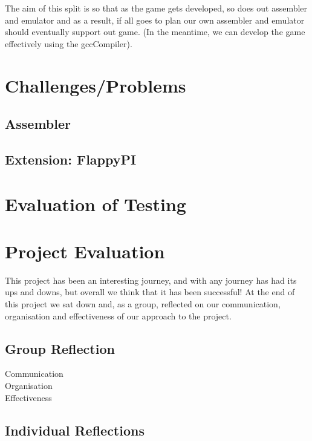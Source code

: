 \documentclass[11pt]{article}
\begin{document}
The aim of this split is so that as the game gets developed, so does out assembler and emulator and as a result, if all goes to plan our own assembler and emulator should eventually support out game. (In the meantime, we can develop the game effectively using the gccCompiler).


\section{Challenges/Problems}

\subsection{Assembler}

\subsection{Extension: FlappyPI}


\section{Evaluation of Testing}




\section{Project Evaluation}
This project has been an interesting journey, and with any journey has had its ups and downs, but overall we think that it has been successful! At the end of this project we sat down and, as a group, reflected on our communication, organisation and effectiveness of our approach to the project.
\subsection{Group Reflection}

\begin{description}
\item[Communication]


\item[Organisation]


\item[Effectiveness]

\end{description}

\subsection{Individual Reflections}
\end{document}
